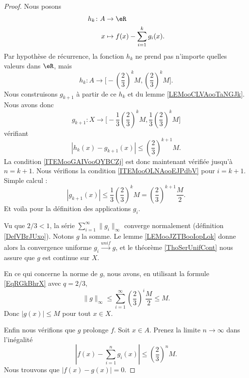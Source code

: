 \begin{proof}
    Nous posons 
    \begin{equation}
        \begin{aligned}
            h_k\colon A&\to \eR \\
            x&\mapsto f(x)-\sum_{i=1}^kg_i(x). 
        \end{aligned}
    \end{equation}
    Par hypothèse de récurrence, la fonction \( h_k\) ne prend pas n'importe quelles valeurs dans \( \eR\), mais
    \begin{equation}
        h_k\colon A\to \mathopen\big[  -\left( \frac{ 2 }{ 3 } \right)^kM  , \left( \frac{ 2 }{ 3 } \right)^kM \mathclose\big].
    \end{equation}
    Nous construisons \( g_{k+1}\) à partir de ce \( h_k\) et du lemme \ref{LEMooCLVAooTaNGJk}. Nous avons donc
    \begin{equation}
        g_{k+1}\colon X\to \mathopen\Big[  -\frac{1}{ 3 }\left( \frac{ 2 }{ 3 } \right)^kM  , \frac{1}{ 3 }\left( \frac{ 2 }{ 3 } \right)^kM \mathclose\Big] 
    \end{equation}
    vérifiant
    \begin{equation}
        | h_k(x)-g_{k+1}(x) |\leq \left( \frac{ 2 }{ 3 } \right)^{k+1}M.
    \end{equation}
    La condition \ref{ITEMooGAIVooQYBCZj} est donc maintenant vérifiée jusqu'à \( n=k+1\). Nous vérifions la condition \ref{ITEMooOLNAooEJPdbV} pour \( i=k+1\). Simple calcul :
    \begin{equation}
        | g_{k+1}(x) |\leq \frac{1}{ 3 }\left( \frac{ 2 }{ 3 } \right)^kM=\left( \frac{ 2 }{ 3 } \right)^{k+1}\frac{ M }{ 2 }.
    \end{equation}
    Et voila pour la définition des applications \( g_i\).

    Vu que \( 2/3<1\), la série \( \sum_{i=1}^{\infty}\| g_i \|_{\infty}\) converge normalement (définition \ref{DefVBrJUxo}). Notons \( g\) la somme. Le lemme \ref{LEMooJZTBooIopLok} donne alors la convergence uniforme \( g_i\stackrel{unif}{\longrightarrow}g\), et le théorème \ref{ThoSerUnifCont} nous assure que \( g\) est continue sur \( X\).

    En ce qui concerne la norme de \( g\), nous avons, en utilisant la formule \eqref{EqRGkBhrX} avec \( q=2/3\),
    \begin{equation}
        \| g \|_{\infty}\leq \sum_{i=1}^{\infty}\left( \frac{ 2 }{ 3 } \right)^i\frac{ M }{2}\leq M.
    \end{equation}
    Donc \( | g(x) |\leq M\) pour tout \( x\in X\).

    Enfin nous vérifions que \( g\) prolonge \( f\). Soit \( x\in A\). Prenez la limite \( n\to \infty\) dans l'inégalité
    \begin{equation}
        | f(x)-\sum_{i=1}^ng_i(x) |\leq \left( \frac{ 2 }{ 3 } \right)^nM.
    \end{equation}
    Nous trouvons que \( | f(x)-g(x) |=0\).
\end{proof}


